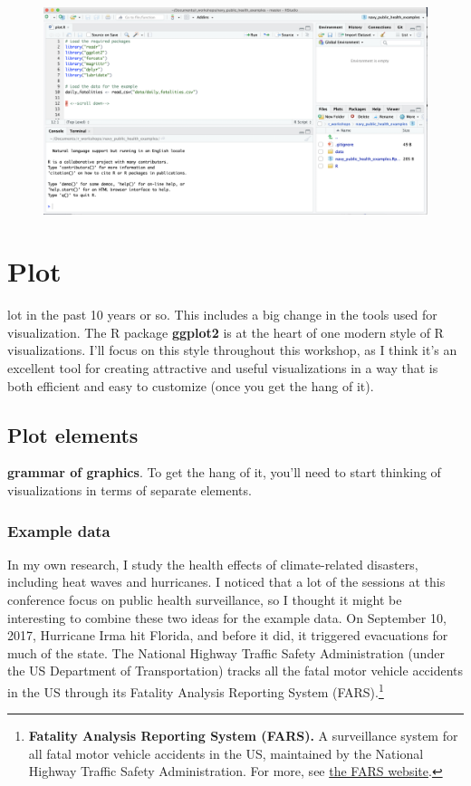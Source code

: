 \documentclass[]{tufte-book}
\begin{document}
\begin{figure}
\includegraphics[width=38.64in]{images/example_repo} \end{figure}

\hypertarget{plot}{%
\chapter{Plot}\label{plot}}

 lot in the past 10 years or so. This
includes a big
change in the tools used for visualization. The R package \textbf{ggplot2} \citep{R-ggplot2}
is at the heart of one modern style of R visualizations. I'll focus on this style
throughout this workshop, as I think it's an excellent tool for creating
attractive and useful visualizations in a way that is both efficient and easy
to customize (once you get the hang of it).

\hypertarget{plot-elements}{%
\section{Plot elements}\label{plot-elements}}

 \textbf{grammar of graphics}. To get the hang
of it, you'll need to start thinking of visualizations in terms of separate elements.

\hypertarget{example-data}{%
\subsection{Example data}\label{example-data}}

In my own research, I study the health effects of climate-related disasters, including
heat waves and hurricanes. I noticed that a lot of the sessions at this conference
focus on public health surveillance, so I thought it might be interesting to combine
these two ideas for the example data. On September 10, 2017, Hurricane Irma hit Florida,
and before it did, it triggered evacuations for much of the state. The National Highway
Traffic Safety Administration (under the US Department of Transportation) tracks all
the fatal motor vehicle accidents in the US through its Fatality Analysis Reporting
System (FARS).\footnote{\textbf{Fatality Analysis Reporting System (FARS).} A surveillance system
  for all fatal motor vehicle accidents in the US, maintained by the National Highway
  Traffic Safety Administration. For more, see
  \href{https://www.nhtsa.gov/research-data/fatality-analysis-reporting-system-fars}{the FARS website}.}
\end{document}

